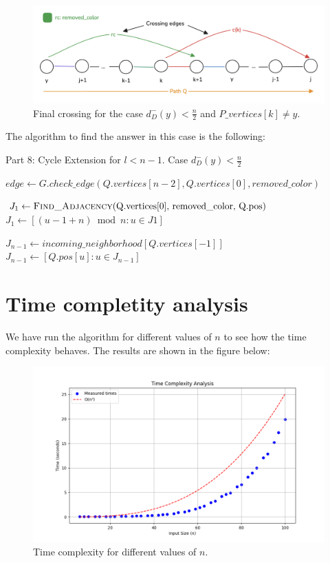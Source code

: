 \begin{figure}[H]
    \centering
    \includegraphics[width=1\textwidth]{figuras/cycle_n-1_last_crossing.png}
    \caption{Final crossing for the case $d^-_D(y) < \frac{n}{2}$ and $P\_vertices[k] \neq y$.}
    \label{fig:cycle_n-1_last_crossing}
\end{figure}

The algorithm to find the answer in this case is the following:

\begin{algorithm}[H]
    \caption{Part 8: Cycle Extension for \( l < n - 1 \). Case \( d^-_D(y) < \frac{n}{2} \)}
    \begin{algorithmic}[1]
            \State $edge \gets G.check\_edge(Q.vertices[n - 2], Q.vertices[0], removed\_color)$
                \State \Return {}
            \EndIf

            \State $J_1 \gets \Call{Find\_Adjacency}{$Q.vertices[0], removed\_color, Q.pos$}$
            \State $J_1 \gets [(u - 1 + n) \bmod n : u \in J1]$

            \State $J_{n-1} \gets incoming\_neighborhood[Q.vertices[-1]]$
            \State $J_{n-1} \gets [Q.pos[u] : u \in J_{n-1}]$
        \EndFunction
    \end{algorithmic}
\end{algorithm}

\section{Time completity analysis}

We have run the algorithm for different values of $n$ to see how the time complexity behaves.
The results are shown in the figure below:

\begin{figure}[H]
    \centering
    \includegraphics[width=1\textwidth]{figuras/time_complexity.png}
    \caption{Time complexity for different values of $n$.}
    \label{fig:time_complexity}
\end{figure}
